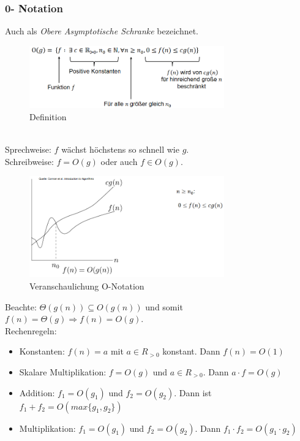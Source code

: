 \documentclass{article}
\begin{document}
            \subsubsection{0- Notation}
                Auch als \textit{Obere Asymptotische Schranke} bezeichnet.\\
                \begin{figure}[ht]
                    \centering
                    \includegraphics[width=0.75\textwidth]{Bilder/ON.png}
                    \caption{Definition}
                    \label{fig:ON}
                \end{figure}\\
                Sprechweise: $f$ wächst höchstens so schnell wie $g$.\\
                Schreibweise: $f=O(g)$ oder auch $f\in O(g)$.\\
                \begin{figure}[ht]
                    \centering
                    \includegraphics[width=0.75\textwidth]{Bilder/VeranschaulichungO.png}
                    \caption{Veranschaulichung O-Notation}
                    \label{fig:VeranschaulichungO}
                \end{figure}
                \newpage
                Beachte: $\Theta(g(n)) \subseteq O(g(n))$ und somit $f(n)=\Theta(g)\Rightarrow f(n)=O(g)$.\\
                Rechenregeln:
                \begin{itemize}
                    \item Konstanten: $f(n)=a$ mit $a\in R_{>0}$ konstant. Dann $f(n)=O(1)$
                    \item Skalare Multiplikation: $f=O(g)$ und $a\in R_{>0}$. Dann $a\cdot f=O(g)$
                    \item Addition: $f_1=O(g_1)$ und $f_2=O(g_2)$. Dann ist $f_1+f_2 =O(max\{g_1,g_2\})$
                    \item Multiplikation: $f_1=O(g_1)$ und $f_2=O(g_2)$. Dann $f_1\cdot f_2=O(g_1\cdot g_2)$
                \end{itemize}
\end{document}
